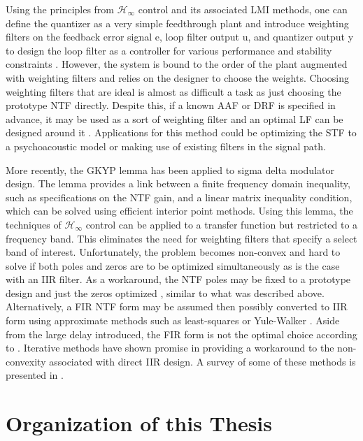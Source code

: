 Using the principles from $\mathcal{H}_\infty$ control and its associated \gls{LMI} methods, one can define the quantizer as a very simple feedthrough plant and introduce weighting filters on the feedback error signal \gls{e}, loop filter output \gls{u}, and quantizer output \gls{y} to design the loop filter as a controller for various performance and stability constraints \cite{Oberoi2004}. However, the system is bound to the order of the plant augmented with weighting filters and relies on the designer to choose the weights. Choosing weighting filters that are ideal is almost as difficult a task as just choosing the prototype \gls{NTF} directly. Despite this, if a known \gls{AAF} or \gls{DRF} is specified in advance, it may be used as a sort of weighting filter and an optimal \gls{LF} can be designed around it \cite{Ohno2017b}. Applications for this method could be optimizing the \gls{STF} to a psychoacoustic model or making use of existing filters in the signal path.

More recently, the \gls{GKYP} lemma has been applied to sigma delta modulator design. The lemma provides a link between a finite frequency domain inequality, such as specifications on the \gls{NTF} gain, and a linear matrix inequality condition, which can be solved using efficient interior point methods. Using this lemma, the techniques of $\mathcal{H}_\infty$ control can be applied to a transfer function but restricted to a frequency band. This eliminates the need for weighting filters that specify a select band of interest. Unfortunately, the problem becomes non-convex and hard to solve if both poles and zeros are to be optimized simultaneously as is the case with an \gls{IIR} filter. As a workaround, the \gls{NTF} poles may be fixed to a prototype design and just the zeros optimized \cite{Osqui2007}, similar to what was described above. Alternatively, a \gls{FIR} \gls{NTF} form may be assumed \cite{Nagahara2012, Tariq2016} then possibly converted to \gls{IIR} form using approximate methods such as least-squares or Yule-Walker \cite{Tariq2017}. Aside from the large delay introduced, the \gls{FIR} form is not the optimal choice according to \cite{Derpich2008}. Iterative methods have shown promise in providing a workaround to the non-convexity associated with direct \gls{IIR} design. A survey of some of these methods is presented in \cite{Callegari2015}.

\section{Organization of this Thesis}
\label{sec:in-org}

